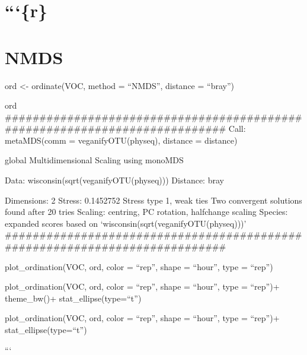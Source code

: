 \documentclass[]{article}
\begin{document}
\section{```\{r\}}\label{r-2}

\section{NMDS}\label{nmds}

ord \textless{}- ordinate(VOC, method = ``NMDS'', distance = ``bray'')

ord
\#\#\#\#\#\#\#\#\#\#\#\#\#\#\#\#\#\#\#\#\#\#\#\#\#\#\#\#\#\#\#\#\#\#\#\#\#\#\#\#\#\#\#\#\#\#\#\#\#\#\#\#\#\#\#\#\#\#\#\#\#\#\#\#\#\#\#\#\#\#\#\#\#\#\#
Call: metaMDS(comm = veganifyOTU(physeq), distance = distance)

global Multidimensional Scaling using monoMDS

Data: wisconsin(sqrt(veganifyOTU(physeq))) Distance: bray

Dimensions: 2 Stress: 0.1452752 Stress type 1, weak ties Two convergent
solutions found after 20 tries Scaling: centring, PC rotation,
halfchange scaling Species: expanded scores based on
`wisconsin(sqrt(veganifyOTU(physeq)))'
\#\#\#\#\#\#\#\#\#\#\#\#\#\#\#\#\#\#\#\#\#\#\#\#\#\#\#\#\#\#\#\#\#\#\#\#\#\#\#\#\#\#\#\#\#\#\#\#\#\#\#\#\#\#\#\#\#\#\#\#\#\#\#\#\#\#\#\#\#\#\#\#\#\#\#

plot\_ordination(VOC, ord, color = ``rep'', shape = ``hour'', type =
``rep'')

plot\_ordination(VOC, ord, color = ``rep'', shape = ``hour'', type =
``rep'')+ theme\_bw()+ stat\_ellipse(type=``t'')

plot\_ordination(VOC, ord, color = ``rep'', shape = ``hour'', type =
``rep'')+ stat\_ellipse(type=``t'')

```
\end{document}
